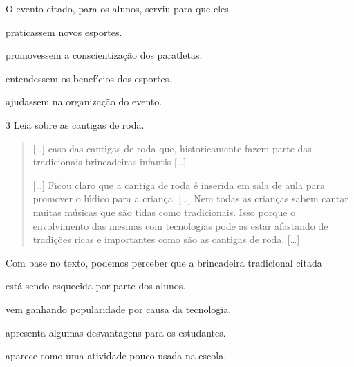 \noindent{}O evento citado, para os alunos, serviu para que eles

\begin{escolha}
\item praticassem novos esportes.

\item promovessem a conscientização dos paratletas.

\item entendessem os benefícios dos esportes.

\item ajudassem na organização do evento.
\end{escolha}


\num{3} Leia sobre as cantigas de roda.
\begin{quote}
  {[}\ldots{}{]} caso das cantigas de roda que, historicamente fazem parte
  das tradicionais brincadeiras infantis {[}\ldots{}{]}

{[}\ldots{}{]} Ficou claro que a cantiga de roda é inserida em sala de aula
para promover o lúdico para a criança. {[}\ldots{}{]} Nem todas as crianças
sabem cantar muitas músicas que são tidas como tradicionais. Isso porque
o envolvimento das mesmas com tecnologias pode as estar afastando de
tradições ricas e importantes como são as cantigas de roda. {[}\ldots{}{]}

\end{quote}

\noindent{}Com base no texto, podemos perceber que a brincadeira tradicional citada

\begin{escolha}
\item está sendo esquecida por parte dos alunos.

\item vem ganhando popularidade por causa da tecnologia.

\item apresenta algumas desvantagens para os estudantes.

\item aparece como uma atividade pouco usada na escola.
\end{escolha}

